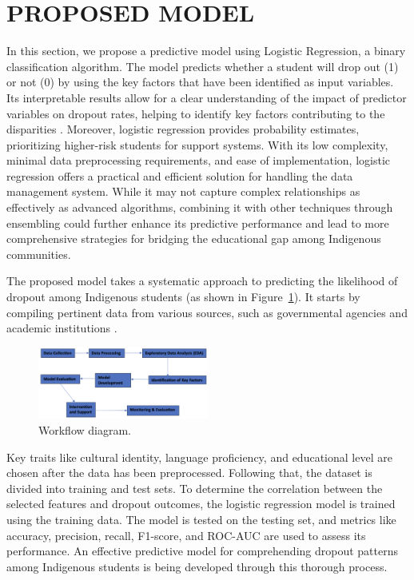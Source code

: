 \documentclass[a4paper,twoside]{article}
\begin{document}
\section{\uppercase{Proposed Model}}
\label{sec:Proposed Methodology}
In this section, we propose a predictive model using Logistic Regression, a
binary classification algorithm. The model predicts whether a student will
drop out (1) or not (0) by using the key factors that have been identified
as input variables. Its interpretable results allow for a clear understanding of the impact of predictor variables on dropout rates, helping to identify key factors contributing to the disparities \cite{Das21}. Moreover, logistic regression provides probability estimates, prioritizing higher-risk students for support systems. With its low complexity, minimal data preprocessing requirements, and ease of implementation, logistic regression offers a practical and efficient solution for handling the data management system. While it may not capture complex relationships as effectively as advanced algorithms, combining it with other techniques through ensembling could further enhance its predictive performance and lead to more comprehensive strategies for bridging the educational gap among Indigenous communities.

The proposed model takes a systematic approach to predicting the likelihood of dropout among Indigenous students (as shown in Figure~\ref{fig:flowdiagram}). It starts by compiling pertinent
data from various sources, such as governmental agencies and academic
institutions \cite{Bisong19}. 
\begin{figure}[H]
    \centering 
    \includegraphics[width=0.5\textwidth, angle=0]{images/FlowDiagram.png}	
    \captionsetup{format=plain, justification=centering}
    \caption{Workflow diagram.}
    \label{fig:flowdiagram}
\end{figure}

Key traits like cultural identity, language proficiency, and educational level are chosen after the data has been preprocessed. Following that, the dataset is divided into training and test sets. To determine the correlation between the selected features and dropout outcomes, the logistic regression model is trained using the training data. The model is tested on the testing set, and metrics like accuracy, precision, recall, F1-score, and ROC-AUC \cite{GMK20} are used to assess its performance. An effective predictive model for comprehending dropout patterns among Indigenous students is being developed through this thorough process.
\end{document}
